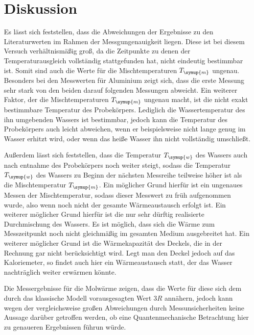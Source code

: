 \section{Diskussion}
\label{sec:Diskussion}

Es lässt sich feststellen, dass die Abweichungen der Ergebnisse zu den Literaturwerten
im Rahmen der Messgungenauigkeit liegen. Diese ist bei diesem Versuch verhältnismäßig groß,
da die Zeitpunkte zu denen der Temperaturausgleich vollständig stattgefunden hat, nicht
eindeutig bestimmbar ist. Somit sind auch die Werte für die Mischtemperaturen $T_{\symup{m}}$
ungenau. Besonders bei den Messwerten für Aluminium zeigt sich, dass die erste Messung
sehr stark von den beiden darauf folgenden Messungen abweicht.
Ein weiterer Faktor, der die Mischtemperaturen $T_{\symup{m}}$ ungenau macht, ist die
nicht exakt bestimmbare Temperatur des Probekörpers. Lediglich die Wassertemperatur des
ihn umgebenden Wassers ist bestimmbar, jedoch kann die Temperatur des Probekörpers auch
leicht abweichen, wenn er beispielsweise nicht lange genug im Wasser erhitzt wird,
oder wenn das heiße Wasser ihn nicht vollständig umschließt.

Außerdem lässt sich feststellen, dass die Temperatur $T_{\symup{w}}$ des Wassers auch
nach entnahme des Probekörpers noch weiter steigt, sodass die Temperatur
$T_{\symup{w}}$ des Wassers zu Beginn der nächsten Messreihe teilweise höher ist
als die Mischtemperatur $T_{\symup{m}}$. Ein möglicher Grund hierfür ist ein ungenaues
Messen der Mischtemperatur, sodass dieser Messwert zu früh aufgenommen wurde, also wenn
noch nicht der gesamte Wärmeaustausch erfolgt ist. Ein weiterer möglicher Grund hierfür
ist die nur sehr dürftig realisierte Durchmischung des Wassers. Es ist möglich, dass
sich die Wärme zum Messzeitpunkt noch nicht gleichmäßig im gesamten Medium ausgebreitet hat.
Ein weiterer möglicher Grund ist die Wärmekapazität des Deckels, die in der Rechnung
gar nicht berücksichtigt wird. Legt man den Deckel jedoch auf das Kaloriemeter, so findet
auch hier ein Wärmeaustausch statt, der das Wasser nachträglich weiter erwärmen könnte.

Die Messergebnisse für die Molwärme zeigen, dass die Werte für diese sich dem durch
das klassische Modell vorausgesagten Wert $3R$ annähern, jedoch kann wegen der vergleichsweise
großen Abweichungen durch Messunsicherheiten keine Aussage darüber getroffen werden, ob
eine Quantenmechanische Betrachtung hier zu genaueren Ergebnissen führun würde.
